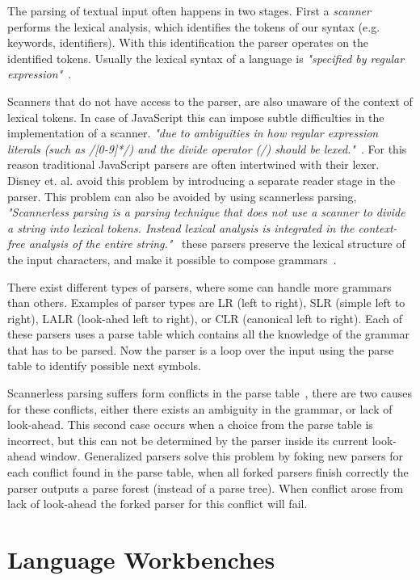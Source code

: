 The parsing of textual input often happens in two stages. First a \textit{scanner} performs the lexical analysis, which identifies the tokens of our syntax (e.g. keywords, identifiers). With this identification the parser operates on the identified tokens. Usually the lexical syntax of a language is \textit{"specified by regular expression"}~\cite{Bravenboer2004}.

Scanners that do not have access to the parser, are also unaware of the context of lexical tokens. In case of JavaScript this can impose subtle difficulties in the implementation of a scanner. \textit{"due to ambiguities in how regular expression literals (such as /[0-9]*/) and the divide operator (/) should be lexed."}~\cite{Disney2014}. For this reason traditional JavaScript parsers are often intertwined with their lexer. Disney et. al. avoid this problem by introducing a separate reader stage in the parser. This problem can also be avoided by using scannerless parsing, \textit{"Scannerless parsing is a parsing technique that does not use a scanner to divide a string into lexical tokens. Instead lexical analysis is integrated in the context-free analysis of the entire string."}~\cite{Visser1997} these parsers preserve the lexical structure of the input characters, and make it possible to compose grammars~\cite{Visser1997}.

There exist different types of parsers, where some can handle more grammars than others. Examples of parser types are LR (left to right), SLR (simple left to right), LALR (look-ahed left to right), or CLR (canonical left to right). Each of these parsers uses a parse table which contains all the knowledge of the grammar that has to be parsed. Now the parser is a loop over the input using the parse table to identify possible next symbols.

Scannerless parsing suffers form conflicts in the parse table~\cite{Visser1997}, there are two causes for these conflicts, either there exists an ambiguity in the grammar, or lack of look-ahead. This second case occurs when a choice from the parse table is incorrect, but this can not be determined by the parser inside its current look-ahead window. Generalized parsers solve this problem by foking new parsers for each conflict found in the parse table, when all forked parsers finish correctly the parser outputs a parse forest (instead of a parse tree). When conflict arose from lack of look-ahead the forked parser for this conflict will fail.

\section{Language Workbenches} \label{rascal}

